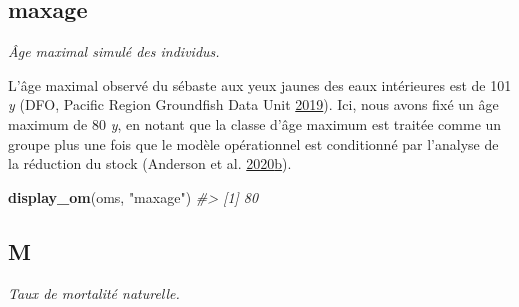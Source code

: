 \documentclass[french,11pt]{book}
\newenvironment{Shaded}{\begin{snugshade}}{\end{snugshade}}
\newcommand{\CommentTok}[1]{\textcolor[rgb]{0.56,0.35,0.01}{\textit{#1}}}
\newcommand{\KeywordTok}[1]{\textcolor[rgb]{0.13,0.29,0.53}{\textbf{#1}}}
\newcommand{\NormalTok}[1]{#1}
\newcommand{\StringTok}[1]{\textcolor[rgb]{0.31,0.60,0.02}{#1}}
\begin{document}
\label{app:desc-stock-yelloweye}

\subsection{maxage}
\label{app:desc-stock-maxage-yelloweye}

\emph{Âge maximal simulé des individus. }

L'âge maximal observé du sébaste aux yeux jaunes des eaux intérieures est de 101 \emph{y} (DFO, Pacific Region Groundfish Data Unit \protect\hyperlink{ref-databases2019}{2019}). Ici, nous avons fixé un âge maximum de 80 \emph{y}, en notant que la classe d'âge maximum est traitée comme un groupe plus une fois que le modèle opérationnel est conditionné par l'analyse de la réduction du stock (Anderson et al. \protect\hyperlink{ref-anderson2020gfmp}{2020}\protect\hyperlink{ref-anderson2020gfmp}{b}).
\begin{Shaded}
\begin{Highlighting}[]
\KeywordTok{display_om}\NormalTok{(oms, }\StringTok{"maxage"}\NormalTok{)}
\CommentTok{#> [1] 80}
\end{Highlighting}
\end{Shaded}
\subsection{M}
\label{app:desc-stock-m-yelloweye}

\emph{Taux de mortalité naturelle.}
\end{document}
